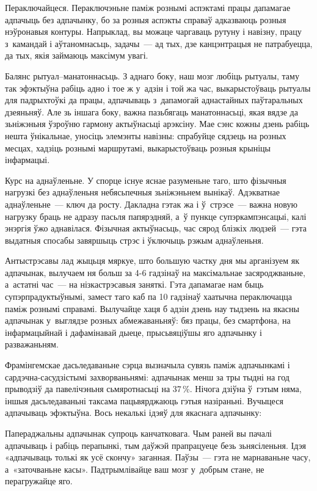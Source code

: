 Пераключайцеся. Пераключэньне паміж рознымі аспэктамі працы дапамагае адпачыць без адпачынку, бо за розныя аспэкты справаў адказваюць розныя нэўронавыя контуры. Напрыклад, вы можаце чаргаваць рутуну і навізну, працу з~камандай і аўтаномнасьць, задачы~--- ад тых, дзе канцэнтрацыя не патрабуецца, да тых, якія займаюць максімум увагі.

Балянс рытуал--манатоннасьць. З аднаго боку, наш мозг любіць рытуалы, таму так эфэктыўна рабіць адно і тое ж у~адзін і той жа час, выкарыстоўваць рытуалы для падрыхтоўкі да працы, адпачываць з~дапамогай аднастайных паўтаральных дзеяньняў. Але зь іншага боку, важна пазьбягаць манатоннасьці, якая вядзе да зьніжэньня ўзроўню гармону актыўнасьці арэксіну. Мае сэнс кожны дзень рабіць нешта ўнікальнае, уносіць элемэнты навізны: спрабуйце сядзець на розных месцах, хадзіць рознымі маршрутамі, выкарыстоўваць розныя крыніцы інфармацыі.

Курс на аднаўленьне. У спорце існуе яснае разуменьне таго, што фізычныя нагрузкі без аднаўленьня небясьпечныя зьніжэньнем вынікаў. Адэкватнае аднаўленьне~--- ключ да росту. Дакладна гэтак жа і ў~стрэсе~--- важна новую нагрузку браць не адразу пасьля папярэдняй, а~ў пункце супэркампэнсацыі, калі энэргія ўжо аднавілася. Фізычная актыўнасьць, час сярод блізкіх людзей~--- гэта выдатныя спосабы завяршыць стрэс і ўключыць рэжым аднаўленьня.

Антыстрэсавы лад жыцьця мяркуе, што большую частку дня мы арганізуем як адпачынак, вылучаем ня больш за 4-6 гадзінаў на максімальнае засяроджваньне, а~астатні час~--- на нізкастрэсавыя заняткі. Гэта дапамагае нам быць супэрпрадуктыўнымі, замест таго каб па 10 гадзінаў хаатычна пераключацца паміж рознымі справамі. Вылучайце хаця б адзін дзень нау тыдзень на якасны адпачынак у~выглядзе розных абмежаваньняў: бяз працы, без смартфона, на інфармацыйнай і дафамінавай дыеце, прысьвяціўшы яго адпачынку і разважаньням.

Фрамінгемскае дасьледаваньне сэрца вызначыла сувязь паміж адпачынкамі і сардэчна-сасудзістымі захворваньнямі: адпачынак менш за тры тыдні на год прыводзіў да павелічэньня сьмяротнасьці на 37\,\%. Нічога дзіўна ў~гэтым няма, іншыя дасьледаваньні таксама пацьвярджаюць гэтыя назіраньні. Вучыцеся адпачываць эфэктыўна. Вось некалькі ідэяў для якаснага адпачынку:

Папераджальны адпачынак супроць канчатковага. Чым раней вы пачалі адпачываць і рабіць перапынкі, тым даўжэй прапрацуеце безь зьнясіленьня. Ідэя «адпачываць толькі як усё скончу» заганная. Паўзы~--- гэта не марнаваньне часу, а~«заточваньне касы». Падтрымлівайце ваш мозг у~добрым стане, не перагружайце яго.

